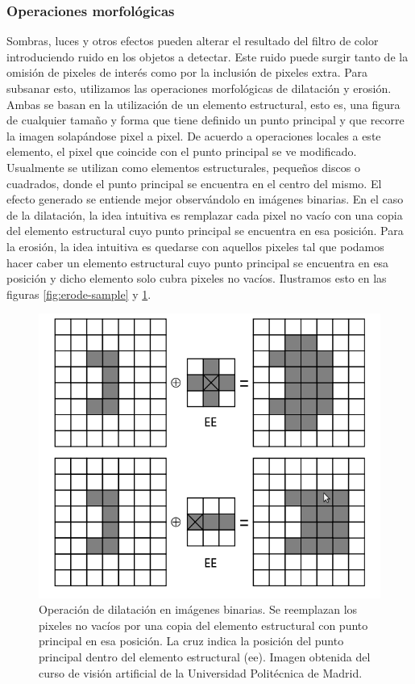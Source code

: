 	\subsubsection{Operaciones morfológicas}
Sombras, luces y otros efectos pueden alterar el resultado del filtro de color introduciendo ruido en los objetos a detectar. Este ruido puede surgir tanto de la omisión de pixeles de interés como por la inclusión de pixeles extra. Para subsanar esto, utilizamos las operaciones morfológicas de dilatación y erosión. Ambas se basan en la utilización de un elemento estructural, esto es, una figura de cualquier tamaño y forma que tiene definido un punto principal y que recorre la imagen solapándose pixel a pixel. De acuerdo a operaciones locales a este elemento, el pixel que coincide con el punto principal se ve modificado. Usualmente se utilizan como elementos estructurales, pequeños discos o cuadrados, donde el punto principal se encuentra en el centro del mismo. El efecto generado se entiende mejor observándolo en imágenes binarias. En el caso de la dilatación, la idea intuitiva es remplazar cada pixel no vacío con una copia del elemento estructural cuyo punto principal se encuentra en esa posición. Para la erosión, la idea intuitiva es quedarse con aquellos pixeles tal que podamos hacer caber un elemento estructural cuyo punto principal se encuentra en esa posición y dicho elemento solo cubra pixeles no vacíos.
Ilustramos esto en las figuras \ref{fig:erode-sample} y \ref{fig:dilate-sample}.


\begin{figure}[tpb]
\begin{center}
  \includegraphics[scale=0.4]{figuras/dilate-sample.png}
\end{center}
  \caption{\small Operación de dilatación en imágenes binarias. Se reemplazan los pixeles no vacíos por una copia del elemento estructural con punto principal en esa posición. La cruz indica la posición del punto principal dentro del elemento estructural (ee). Imagen obtenida del curso de visión artificial de la Universidad Politécnica de Madrid.}
  \label{fig:dilate-sample}
\end{figure}


